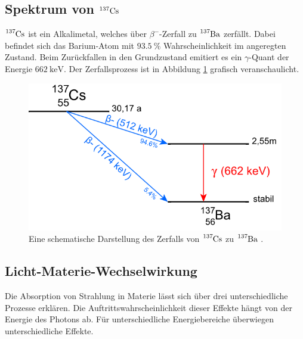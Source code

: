 \subsection{Spektrum von $^{137}\text{Cs}$}

\noindent
$\ce{^{137}Cs}$ ist ein Alkalimetal, welches über $\beta^-$-Zerfall zu $\ce{^{137}Ba}$ zerfällt. 
Dabei befindet sich das Barium-Atom mit $\SI{93.5}{\percent}$ Wahrscheinlichkeit im angeregten Zustand. 
Beim Zurückfallen in den Grundzustand emitiert es ein $\gamma$-Quant der Energie $\SI{662}{\kilo\electronvolt}$.
Der Zerfallsprozess ist in Abbildung \ref{img:decay} grafisch veranschaulicht.


\begin{figure}[H]
    \centering
    \includegraphics[width=0.45 \textwidth]{latex/images/zerfall.PNG}
    \caption{Eine schematische Darstellung des Zerfalls von $\ce{^{137}Cs}$ zu $\ce{^{137}Ba}$ \protect \cite{leifi}.}
    \label{img:decay}
\end{figure}


\subsection{Licht-Materie-Wechselwirkung}

\noindent
Die Absorption von Strahlung in Materie lässt sich über drei unterschiedliche Prozesse erklären. 
Die Auftrittswahrscheinlichkeit dieser Effekte hängt von der Energie des Photons ab. 
Für unterschiedliche Energiebereiche überwiegen unterschiedliche Effekte.

